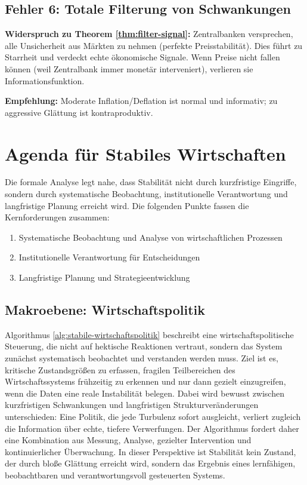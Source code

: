 \documentclass[a4paper, 12pt, twoside, openright]{report}
\theoremstyle{definition}
\theoremstyle{definition}
\begin{document}
\subsection{Fehler 6: Totale Filterung von Schwankungen}

\textbf{Widerspruch zu Theorem \ref{thm:filter-signal}:}
Zentralbanken versprechen, alle Unsicherheit aus Märkten zu nehmen (perfekte Preisstabilität). Dies führt zu Starrheit und verdeckt echte ökonomische Signale. Wenn Preise nicht fallen können (weil Zentralbank immer monetär interveniert), verlieren sie Informationsfunktion.

\textbf{Empfehlung:} Moderate Inflation/Deflation ist normal und informativ; zu aggressive Glättung ist kontraproduktiv.

\section{Agenda für Stabiles Wirtschaften}

Die formale Analyse legt nahe, dass Stabilität nicht durch kurzfristige Eingriffe, sondern durch systematische Beobachtung, institutionelle Verantwortung und langfristige Planung erreicht wird. Die folgenden Punkte fassen die Kernforderungen zusammen:
\begin{enumerate}
\item Systematische Beobachtung und Analyse von wirtschaftlichen Prozessen
\item Institutionelle Verantwortung für Entscheidungen
\item Langfristige Planung und Strategieentwicklung
\end{enumerate}

\subsection{Makroebene: Wirtschaftspolitik}

Algorithmus \ref{alg:stabile-wirtschaftspolitik} beschreibt eine wirtschaftspolitische Steuerung, die nicht auf hektische Reaktionen vertraut, sondern das System zunächst systematisch beobachtet und verstanden werden muss. Ziel ist es, kritische Zustandsgrößen zu erfassen, fragilen Teilbereichen des Wirtschaftssystems frühzeitig zu erkennen und nur dann gezielt einzugreifen, wenn die Daten eine reale Instabilität belegen. Dabei wird bewusst zwischen kurzfristigen Schwankungen und langfristigen Strukturveränderungen unterschieden: Eine Politik, die jede Turbulenz sofort ausgleicht, verliert zugleich die Information über echte, tiefere Verwerfungen. Der Algorithmus fordert daher eine Kombination aus Messung, Analyse, gezielter Intervention und kontinuierlicher Überwachung. In dieser Perspektive ist Stabilität kein Zustand, der durch bloße Glättung erreicht wird, sondern das Ergebnis eines lernfähigen, beobachtbaren und verantwortungsvoll gesteuerten Systems.
\end{document}
